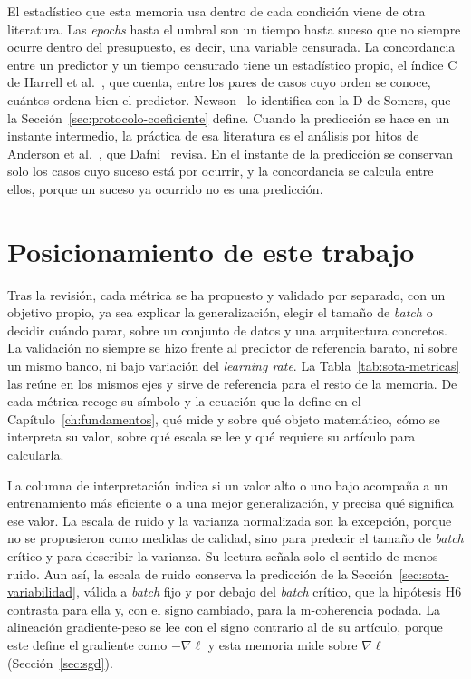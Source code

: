 El estadístico que esta memoria usa dentro de cada condición viene de otra literatura. Las \emph{epochs} hasta el umbral son un tiempo hasta suceso que no siempre ocurre dentro del presupuesto, es decir, una variable censurada. La concordancia entre un predictor y un tiempo censurado tiene un estadístico propio, el índice C de Harrell et al.~\cite{harrell1982evaluating,harrell1996multivariable}, que cuenta, entre los pares de casos cuyo orden se conoce, cuántos ordena bien el predictor. Newson~\cite{newson2002parameters} lo identifica con la D de Somers, que la Sección~\ref{sec:protocolo-coeficiente} define. Cuando la predicción se hace en un instante intermedio, la práctica de esa literatura es el análisis por hitos de Anderson et al.~\cite{anderson1983analysis}, que Dafni~\cite{dafni2011landmark} revisa. En el instante de la predicción se conservan solo los casos cuyo suceso está por ocurrir, y la concordancia se calcula entre ellos, porque un suceso ya ocurrido no es una predicción.

\section{Posicionamiento de este trabajo}
\label{sec:sota-hueco}

Tras la revisión, cada métrica se ha propuesto y validado por separado, con un objetivo propio, ya sea explicar la generalización, elegir el tamaño de \emph{batch} o decidir cuándo parar, sobre un conjunto de datos y una arquitectura concretos. La validación no siempre se hizo frente al predictor de referencia barato, ni sobre un mismo banco, ni bajo variación del \emph{learning rate}. La Tabla~\ref{tab:sota-metricas} las reúne en los mismos ejes y sirve de referencia para el resto de la memoria. De cada métrica recoge su símbolo y la ecuación que la define en el Capítulo~\ref{ch:fundamentos}, qué mide y sobre qué objeto matemático, cómo se interpreta su valor, sobre qué escala se lee y qué requiere su artículo para calcularla.

La columna de interpretación indica si un valor alto o uno bajo acompaña a un entrenamiento más eficiente o a una mejor generalización, y precisa qué significa ese valor. La escala de ruido y la varianza normalizada son la excepción, porque no se propusieron como medidas de calidad, sino para predecir el tamaño de \emph{batch} crítico y para describir la varianza. Su lectura señala solo el sentido de menos ruido. Aun así, la escala de ruido conserva la predicción de la Sección~\ref{sec:sota-variabilidad}, válida a \emph{batch} fijo y por debajo del \emph{batch} crítico, que la hipótesis H6 contrasta para ella y, con el signo cambiado, para la m-coherencia podada. La alineación gradiente-peso se lee con el signo contrario al de su artículo, porque este define el gradiente como $-\nabla\ell$ y esta memoria mide sobre $\nabla\ell$ (Sección~\ref{sec:sgd}).

